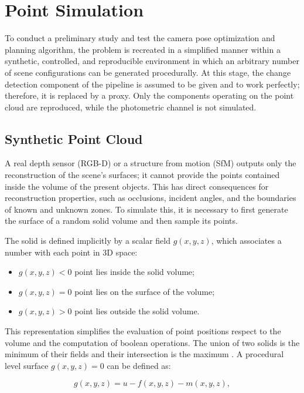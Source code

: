 \section{Point Simulation}
To conduct a preliminary study and test the camera pose optimization and planning algorithm, the problem is recreated in a simplified manner within a synthetic, controlled, and reproducible environment in which an arbitrary number of scene configurations can be generated procedurally. At this stage, the change detection component of the pipeline is assumed to be given and to work perfectly; therefore, it is replaced by a proxy. Only the components operating on the point cloud are reproduced, while the photometric channel is not simulated.

\subsection{Synthetic Point Cloud}
A real depth sensor (RGB-D) or a structure from motion (SfM) outputs only the reconstruction of the scene's surfaces; it cannot provide the points contained inside the volume of the present objects. This has direct consequences for reconstruction properties, such as occlusions, incident angles, and the boundaries of known and unknown zones. To simulate this, it is necessary to first generate the surface of a random solid volume and then sample its points.

The solid is defined implicitly by a scalar field $g(x,y,z)$, which associates a number with each point in 3D space:
\begin{itemize}
  \item $g(x,y,z)<0$ point lies inside the solid volume;
  \item $g(x,y,z)=0$ point lies on the surface of the volume;
  \item $g(x,y,z)>0$ point lies outside the solid volume.
\end{itemize}

This representation simplifies the evaluation of point positions respect to the volume and the computation of boolean operations. The union of two solids is the minimum of their fields and their intersection is the maximum \cite{ricciConstructiveGeometryComputer1973}. A procedural level surface $g(x,y,z)=0$ can be defined as:

\begin{equation}
  g(x,y,z) = u - f(x,y,z) - m(x,y,z),
  \label{eq:level_surface}
\end{equation}

